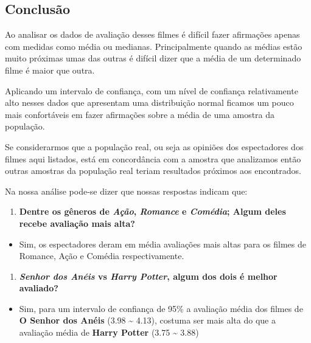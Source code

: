 \documentclass[]{article}
\providecommand{\tightlist}{%
  \setlength{\itemsep}{0pt}\setlength{\parskip}{0pt}}
\begin{document}
\newpage

\hypertarget{conclusuxe3o}{%
\subsection{Conclusão}\label{conclusuxe3o}}

Ao analisar os dados de avaliação desses filmes é difícil fazer
afirmações apenas com medidas como média ou medianas. Principalmente
quando as médias estão muito próximas umas das outras é difícil dizer
que a média de um determinado filme é maior que outra.

Aplicando um intervalo de confiança, com um nível de confiança
relativamente alto nesses dados que apresentam uma distribuição normal
ficamos um pouco mais confortáveis em fazer afirmações sobre a média de
uma amostra da população.

Se considerarmos que a população real, ou seja as opiniões dos
espectadores dos filmes aqui listados, está em concordância com a
amostra que analizamos então outras amostras da população real teriam
resultados próximos aos encontrados.

Na nossa análise pode-se dizer que nossas respostas indicam que:

\begin{enumerate}
\def\labelenumi{\arabic{enumi}.}
\tightlist
\item
  \textbf{Dentre os gêneros de \emph{Ação}, \emph{Romance} e
  \emph{Comédia}; Algum deles recebe avaliação mais alta?}
\end{enumerate}

\begin{itemize}
\tightlist
\item
  Sim, os espectadores deram em média avaliações mais altas para os
  filmes de Romance, Ação e Comédia respectivamente.
\end{itemize}

\begin{enumerate}
\def\labelenumi{\arabic{enumi}.}
\setcounter{enumi}{1}
\tightlist
\item
  \textbf{\emph{Senhor dos Anéis} vs \emph{Harry Potter}, algum dos dois
  é melhor avaliado?}
\end{enumerate}

\begin{itemize}
\tightlist
\item
  Sim, para um intervalo de confiança de 95\% a avaliação média dos
  filmes de \textbf{O Senhor dos Anéis} (3.98 \textasciitilde{} 4.13),
  costuma ser mais alta do que a avaliação média de \textbf{Harry
  Potter} (3.75 \textasciitilde{} 3.88)
\end{itemize}
\end{document}
